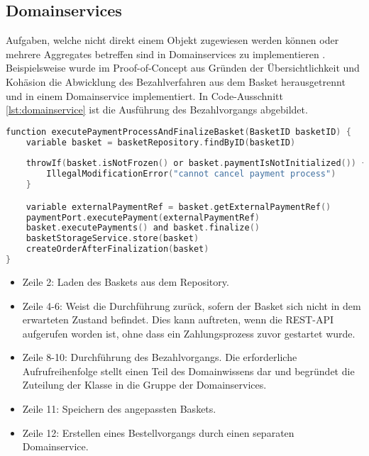\pagebreak

\subsection{Domainservices}

Aufgaben, welche nicht direkt einem Objekt zugewiesen werden können oder mehrere Aggregates betreffen sind in Domainservices zu implementieren \cite[S. 267]{Vernon.2015}. Beispielsweise wurde im Proof-of-Concept aus Gründen der Übersichtlichkeit und Kohäsion die Abwicklung des Bezahlverfahren aus dem Basket herausgetrennt und in einem Domainservice implementiert. In Code-Ausschnitt \ref{lst:domainservice} ist die Ausführung des Bezahlvorgangs abgebildet. 

\vspace{0.5cm}
\begin{minipage}{\linewidth} %
	\begin{lstlisting}[caption={Ausführung des Bezahlvorgangs in einem Domainservice}, label={lst:domainservice}, language=Kotlin]
function executePaymentProcessAndFinalizeBasket(BasketID basketID) {
	variable basket = basketRepository.findByID(basketID)
	
	throwIf(basket.isNotFrozen() or basket.paymentIsNotInitialized()) {
		IllegalModificationError("cannot cancel payment process")
	}

	variable externalPaymentRef = basket.getExternalPaymentRef()
	paymentPort.executePayment(externalPaymentRef)
	basket.executePayments() and basket.finalize()
	basketStorageService.store(basket)
	createOrderAfterFinalization(basket)
}
	\end{lstlisting}
	\begin{itemize}
		\setlength\itemsep{-1pt}
		\item Zeile 2: Laden des Baskets aus dem Repository.
		\item Zeile 4-6: Weist die Durchführung zurück, sofern der Basket sich nicht in dem erwarteten Zustand befindet. Dies kann auftreten, wenn die REST-API aufgerufen worden ist, ohne dass ein Zahlungsprozess zuvor gestartet wurde.
		\item Zeile 8-10: Durchführung des Bezahlvorgangs. Die erforderliche Aufrufreihenfolge stellt einen Teil des Domainwissens dar und begründet die Zuteilung der Klasse in die Gruppe der Domainservices.
		\item Zeile 11: Speichern des angepassten Baskets.
		\item Zeile 12: Erstellen eines Bestellvorgangs durch einen separaten Domainservice.
	\end{itemize}
\end{minipage}

